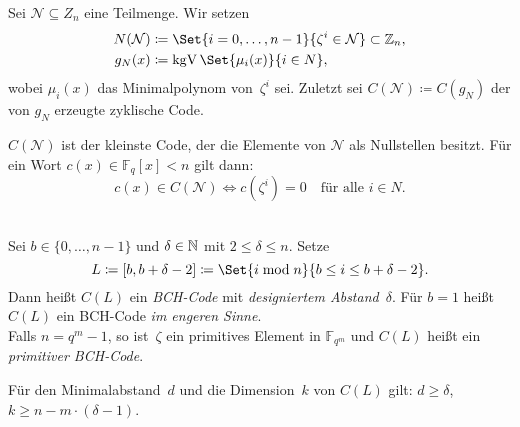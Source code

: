 \documentclass{cheat-sheet}
\newcommand{\F}{\mathbb{F}} %
\DeclareMathOperator{\kgV}{kgV} %
\begin{document}
\begin{konstr}
  Sei $\mathcal{N} \subseteq Z_n$ eine Teilmenge.
  Wir setzen
  \begin{align*}
    N(\mathcal{N}) & \coloneqq \Set{i = 0, \ldots, n-1}{\zeta^i \in \mathcal{N}} \subset \Z_n, \\
    g_N(x) & \coloneqq \kgV \Set{\mu_i(x)}{i \in N},
  \end{align*}
  wobei $\mu_i(x)$ das Minimalpolynom von~$\zeta^i$ sei.
  Zuletzt sei $C(\mathcal{N}) \coloneqq C(g_N)$ der von $g_N$ erzeugte zyklische Code.
\end{konstr}

\begin{bem}
  $C(\mathcal{N})$ ist der kleinste Code, der die Elemente von $\mathcal{N}$ als Nullstellen besitzt. 
  Für ein Wort $c(x) \in \F_q[x]{< n}$ gilt dann:
  \[
    c(x) \in C(\mathcal{N}) \iff c(\zeta^i) = 0 \quad \text{für alle $i \in N$}.
  \]
\end{bem}

\begin{defn} \mbox{} \\
  Sei $b \in \{ 0, \ldots, n-1 \}$ und $\delta \in \mathbb{N}$ mit $2 \leq \delta \leq n$.
  Setze
  \[
    L \coloneqq [b, b + \delta - 2] \coloneqq \Set{i \bmod{n}}{b \leq i \leq b + \delta - 2}.
  \]
  Dann heißt $C(L)$ ein \emph{BCH-Code} mit \emph{designiertem Abstand}~$\delta$.
  Für $b=1$ heißt~$C(L)$ ein BCH-Code \textit{im engeren Sinne}. \\
  Falls $n = q^m - 1$, so ist~$\zeta$ ein primitives Element in $\F_{q^m}$ und $C(L)$ heißt ein \emph{primitiver BCH-Code}.
\end{defn}

\begin{satz}
  Für den Minimalabstand~$d$ und die Dimension~$k$ von $C(L)$ gilt: \quad
  $d \geq \delta$, \enspace
  $k \geq n - m \cdot (\delta - 1)$.
\end{satz}
\end{document}
